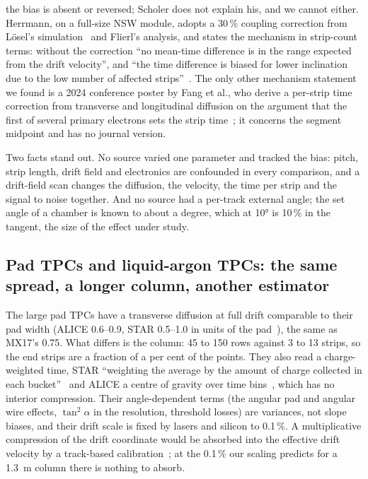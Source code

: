 the bias is absent or reversed; Scholer does not explain his, and we cannot either. Herrmann, on a full-size NSW module, adopts a 30\,\% coupling correction from Lösel's
simulation~\cite{Loesel2017} and Flierl's analysis, and states the mechanism in strip-count terms: without the correction ``no
mean-time difference is in the range expected from the drift velocity'', and ``the time difference is biased for lower
inclination due to the low number of affected strips''~\cite{Herrmann2019}. The only other mechanism statement we found is a
2024 conference poster by Fang et al., who derive a per-strip time correction from transverse and longitudinal diffusion on the
argument that the first of several primary electrons sets the strip time~\cite{Fang2024}; it concerns the segment midpoint and
has no journal version.

Two facts stand out. No source varied one parameter and tracked the bias: pitch, strip length, drift field and electronics are
confounded in every comparison, and a drift-field scan changes the diffusion, the velocity, the time per strip and the signal
to noise together. And no source had a per-track external angle; the set angle of a chamber is known to about a degree, which at
\ang{10} is 10\,\% in the tangent, the size of the effect under study.

\subsection{Pad TPCs and liquid-argon TPCs: the same spread, a longer column, another estimator}

The large pad TPCs have a transverse diffusion at full drift comparable to their pad width (ALICE 0.6--0.9, STAR 0.5--1.0 in
units of the pad~\cite{Alme2010,Anderson2003}), the same as MX17's 0.75. What differs is the column: 45 to 150 rows against 3
to 13 strips, so the end strips are a fraction of a per cent of the points. They also read a charge-weighted time, STAR
``weighting the average by the amount of charge collected in each bucket''~\cite{Anderson2003} and ALICE a centre of gravity over
time bins~\cite{Alme2010}, which has no interior compression. Their angle-dependent terms (the angular pad and angular wire effects,
$\tan^2\alpha$ in the resolution, threshold losses) are variances, not slope biases, and their drift scale is fixed by lasers
and silicon to 0.1\,\%. A multiplicative compression of the drift coordinate would be absorbed into the effective drift
velocity by a track-based calibration~\cite{Alme2010}; at the 0.1\,\% our scaling predicts for a 1.3~m column there is nothing to
absorb.


